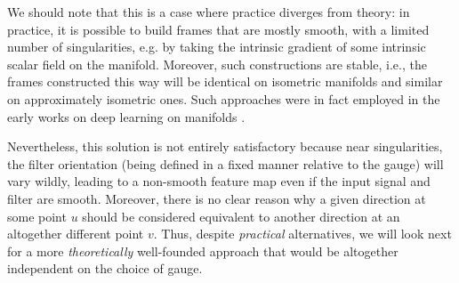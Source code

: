 We should note that this is a case where practice diverges from theory: in practice, 
it is possible to build frames that are mostly smooth, with a limited number of singularities, e.g. by taking the intrinsic gradient of some intrinsic scalar field on the manifold.   
%
Moreover, such constructions are stable, i.e., the frames constructed this way will be identical on isometric manifolds and similar on approximately isometric ones. 
%
Such approaches were in fact employed in the early works on deep learning on manifolds  \citep{masci2015geodesic,monti2017geometric}.


Nevertheless, this solution is not entirely satisfactory because near singularities, the filter orientation (being defined in a fixed manner relative to the gauge) will vary wildly, leading to a non-smooth feature map even if the input signal and filter are smooth. 
%
Moreover, there is no clear reason why a given direction at some point $u$ should be considered equivalent to another direction at an altogether different point $v$. 
%
Thus, despite {\em practical} alternatives, we will look next for 
a more {\em theoretically} well-founded approach that would be altogether independent on the choice of gauge. 


